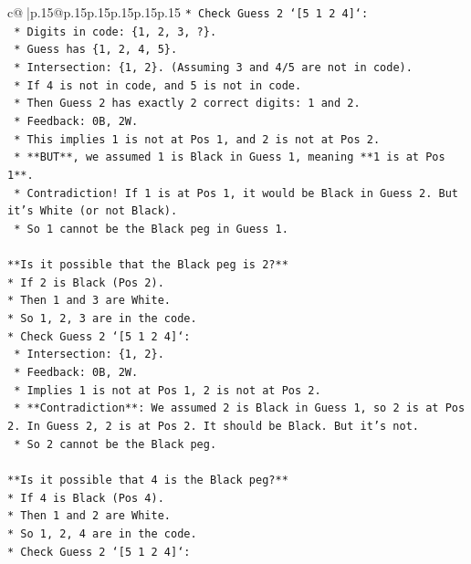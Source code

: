 \documentclass{article}
\begin{document}
{\begin{supertabular}{c@{$\;$}|p{.15\linewidth}@{}p{.15\linewidth}p{.15\linewidth}p{.15\linewidth}p{.15\linewidth}p{.15\linewidth}}
{{{\texttt{*   Check Guess 2 `{[}5 1 2 4{]}`:} \\
\texttt{    *   Digits in code: \{1, 2, 3, ?\}.} \\
\texttt{    *   Guess has \{1, 2, 4, 5\}.} \\
\texttt{    *   Intersection: \{1, 2\}. (Assuming 3 and 4/5 are not in code).} \\
\texttt{    *   If 4 is not in code, and 5 is not in code.} \\
\texttt{    *   Then Guess 2 has exactly 2 correct digits: 1 and 2.} \\
\texttt{    *   Feedback: 0B, 2W.} \\
\texttt{    *   This implies 1 is not at Pos 1, and 2 is not at Pos 2.} \\
\texttt{    *   **BUT**, we assumed 1 is Black in Guess 1, meaning **1 is at Pos 1**.} \\
\texttt{    *   Contradiction! If 1 is at Pos 1, it would be Black in Guess 2. But it's White (or not Black).} \\
\texttt{    *   So 1 cannot be the Black peg in Guess 1.} \\
\\ 
\texttt{**Is it possible that the Black peg is 2?**} \\
\texttt{*   If 2 is Black (Pos 2).} \\
\texttt{*   Then 1 and 3 are White.} \\
\texttt{*   So 1, 2, 3 are in the code.} \\
\texttt{*   Check Guess 2 `{[}5 1 2 4{]}`:} \\
\texttt{    *   Intersection: \{1, 2\}.} \\
\texttt{    *   Feedback: 0B, 2W.} \\
\texttt{    *   Implies 1 is not at Pos 1, 2 is not at Pos 2.} \\
\texttt{    *   **Contradiction**: We assumed 2 is Black in Guess 1, so 2 is at Pos 2. In Guess 2, 2 is at Pos 2. It should be Black. But it's not.} \\
\texttt{    *   So 2 cannot be the Black peg.} \\
\\ 
\texttt{**Is it possible that 4 is the Black peg?**} \\
\texttt{*   If 4 is Black (Pos 4).} \\
\texttt{*   Then 1 and 2 are White.} \\
\texttt{*   So 1, 2, 4 are in the code.} \\
\texttt{*   Check Guess 2 `{[}5 1 2 4{]}`:} \\
}}}
\end{supertabular}}
\end{document}
